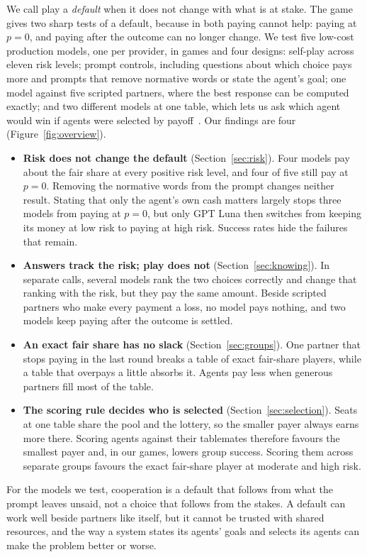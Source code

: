 We call play a \emph{default} when it does not change with what is at stake. The game gives
two sharp tests of a default, because in both paying cannot help: paying at $p=0$, and
paying after the outcome can no longer change. We test five low-cost production models, one
per provider, in \CntGames{} games and four designs: self-play across eleven risk levels;
prompt controls, including questions about which choice pays more and prompts that remove
normative words or state the agent's goal; one model against five scripted partners, where
the best response can be computed exactly; and two different models at one table, which lets
us ask which agent would win if agents were selected by
payoff~\cite{wellman2006methods,tuyls2018generalised}. Our findings are four
(Figure~\ref{fig:overview}).

\begin{itemize}
\item \textbf{Risk does not change the default} (Section~\ref{sec:risk}). Four models pay
  about the fair share at every positive risk level, and four of five still pay at $p=0$.
  Removing the normative words from the prompt changes neither result. Stating that only
  the agent's own cash matters largely stops three models from paying at $p=0$, but only
  GPT Luna then switches from keeping its money at low risk to paying at high risk. Success
  rates hide the failures that remain.
\item \textbf{Answers track the risk; play does not} (Section~\ref{sec:knowing}). In
  separate calls, several models rank the two choices correctly and change that ranking with
  the risk, but they pay the same amount. Beside scripted partners who make every payment a
  loss, no model pays nothing, and two models keep paying after the outcome is settled.
\item \textbf{An exact fair share has no slack} (Section~\ref{sec:groups}). One partner
  that stops paying in the last round breaks a table of exact fair-share players, while a
  table that overpays a little absorbs it. Agents pay less when generous partners fill most
  of the table.
\item \textbf{The scoring rule decides who is selected} (Section~\ref{sec:selection}).
  Seats at one table share the pool and the lottery, so the smaller payer always earns more
  there. Scoring agents against their tablemates therefore favours the smallest payer and,
  in our games, lowers group success. Scoring them across separate groups favours the exact
  fair-share player at moderate and high risk.
\end{itemize}

For the models we test, cooperation is a default that follows from what the prompt leaves
unsaid, not a choice that follows from the stakes. A default can work well beside partners
like itself, but it cannot be trusted with shared resources, and the way a system states
its agents' goals and selects its agents can make the problem better or worse.
